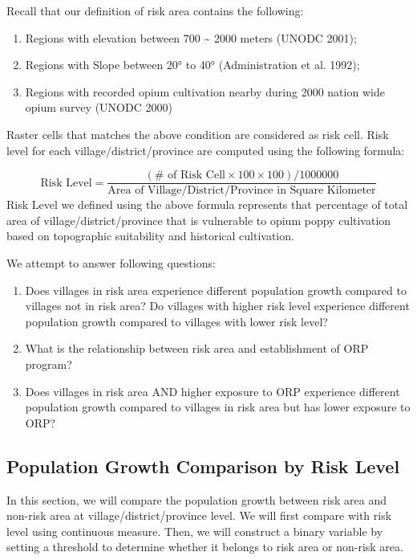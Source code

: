 \documentclass[
  letterpaper,
  DIV=11,
  numbers=noendperiod]{scrartcl}
\providecommand{\tightlist}{%
  \setlength{\itemsep}{0pt}\setlength{\parskip}{0pt}}\usepackage{longtable,booktabs,array}
\begin{document}
Recall that our definition of risk area contains the following:

\begin{enumerate}
\def\labelenumi{\alph{enumi}.}
\tightlist
\item
  Regions with elevation between 700 \textasciitilde{} 2000 meters
  (UNODC 2001);
\item
  Regions with Slope between 20° to 40° (Administration et al. 1992);
\item
  Regions with recorded opium cultivation nearby during 2000 nation wide
  opium survey (UNODC 2000)
\end{enumerate}

Raster cells that matches the above condition are considered as risk
cell. Risk level for each village/district/province are computed using
the following formula:

\[
\textrm{Risk Level} = \frac{(\textrm{# of Risk Cell} \times 100 \times 100) / 1000000}{\textrm{Area of Village/District/Province in Square Kilometer}}
\] Risk Level we defined using the above formula represents that
percentage of total area of village/district/province that is vulnerable
to opium poppy cultivation based on topographic suitability and
historical cultivation.

We attempt to answer following questions:

\begin{enumerate}
\def\labelenumi{\arabic{enumi}.}
\tightlist
\item
  Does villages in risk area experience different population growth
  compared to villages not in risk area? Do villages with higher risk
  level experience different population growth compared to villages with
  lower risk level?
\item
  What is the relationship between risk area and establishment of ORP
  program?
\item
  Does villages in risk area AND higher exposure to ORP experience
  different population growth compared to villages in risk area but has
  lower exposure to ORP?
\end{enumerate}

\subsection{Population Growth Comparison by Risk
Level}\label{population-growth-comparison-by-risk-level}

In this section, we will compare the population growth between risk area
and non-risk area at village/district/province level. We will first
compare with risk level using continuous measure. Then, we will
construct a binary variable by setting a threshold to determine whether
it belongs to risk area or non-risk area.
\end{document}
